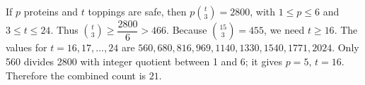 If $p$ proteins and $t$ toppings are safe, then $p\binom t3=2800$, with $1\le p\le6$ and $3\le t\le24$. Thus $\binom t3\ge\dfrac{2800}{6}>466$. Because $\binom{15}{3}=455$, we need $t\ge16$. The values for $t=16,17,\ldots,24$ are $560,680,816,969,1140,1330,1540,1771,2024$. Only 560 divides 2800 with integer quotient between 1 and 6; it gives $p=5$, $t=16$. Therefore the combined count is $\boxed{21}$.
